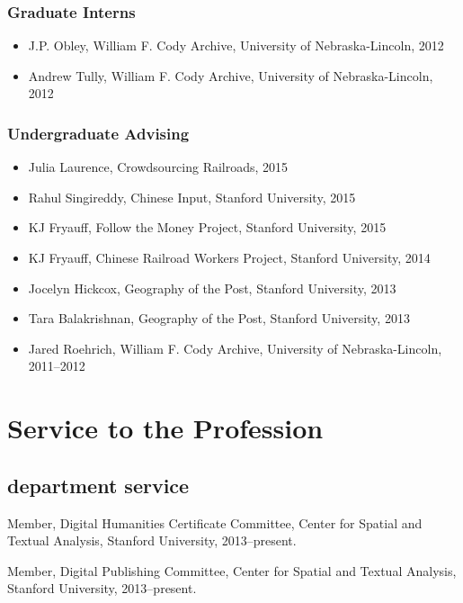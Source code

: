 \subsubsection{Graduate Interns}\label{graduate-interns}

\begin{itemize}
\tightlist
\item
  J.P. Obley, William F. Cody Archive, University of Nebraska-Lincoln,
  2012
\item
  Andrew Tully, William F. Cody Archive, University of Nebraska-Lincoln,
  2012
\end{itemize}

\subsubsection{Undergraduate Advising}\label{undergraduate-advising}

\begin{itemize}
\tightlist
\item
  Julia Laurence, Crowdsourcing Railroads, 2015
\item
  Rahul Singireddy, Chinese Input, Stanford University, 2015
\item
  KJ Fryauff, Follow the Money Project, Stanford University, 2015
\item
  KJ Fryauff, Chinese Railroad Workers Project, Stanford University,
  2014
\item
  Jocelyn Hickcox, Geography of the Post, Stanford University, 2013
\item
  Tara Balakrishnan, Geography of the Post, Stanford University, 2013
\item
  Jared Roehrich, William F. Cody Archive, University of
  Nebraska-Lincoln, 2011--2012
\end{itemize}

\section{Service to the Profession}\label{service-to-the-profession}

\subsection{department service}\label{department-service}

Member, Digital Humanities Certificate Committee, Center for Spatial and
Textual Analysis, Stanford University, 2013--present.

Member, Digital Publishing Committee, Center for Spatial and Textual
Analysis, Stanford University, 2013--present.


